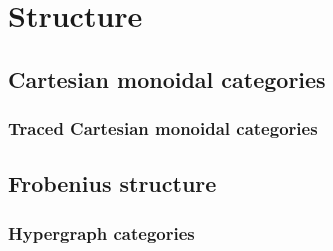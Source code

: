 \section{Structure}

\subsection{Cartesian monoidal categories}

\subsubsection{Traced Cartesian monoidal categories}

\subsection{Frobenius structure}

\subsubsection{Hypergraph categories}